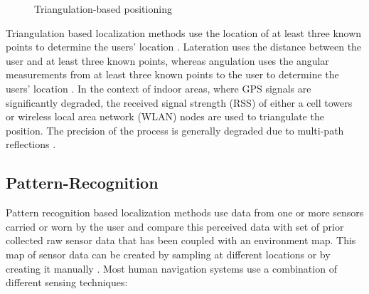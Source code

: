             \begin{figure}[htpb!]
                \centering
                \caption{Triangulation-based positioning}
                \label{fig:litRev_triangulation}
          	  \end{figure}
            
            Triangulation based localization methods use the location of at least three known points to determine the users’ location \cite{zheng2010smart}. Lateration uses the distance between the user and at least three known points, whereas angulation uses the angular measurements from at least three known points to the user to determine the users’ location \cite{zheng2010smart}. In the context of indoor areas, where GPS signals are  significantly degraded, the received signal strength (RSS) of either a cell towers or wireless local area network (WLAN) nodes are used to triangulate the position. The precision of the process is generally degraded due to multi-path reflections \cite{fallah2013indoor}. 
            
            \subsection{Pattern-Recognition}
            
            Pattern recognition based localization methods use data from one or more sensors carried or worn by the user and compare this perceived data with set of prior collected raw sensor data that has been coupled with an environment map. This map of sensor data can be created by sampling at different locations or by creating it manually \cite{fallah2013indoor}. Most human navigation systems use a combination of different sensing techniques:
            
